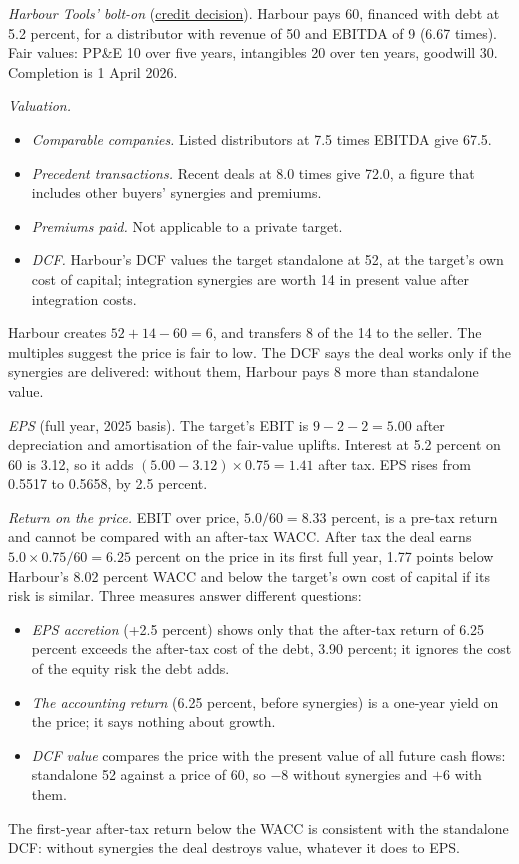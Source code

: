 \begin{qfexample}
 \emph{Harbour Tools' bolt-on} (\hyperref[ex:integrated-credit-decision]{credit decision}). Harbour pays 60, financed with debt at 5.2 percent, for a distributor with revenue of 50 and EBITDA of 9 (6.67 times). Fair values: PP\&E 10 over five years, intangibles 20 over ten years, goodwill 30. Completion is 1 April 2026.

\emph{Valuation.}
\begin{itemize}
\item \emph{Comparable companies.} Listed distributors at 7.5 times EBITDA give 67.5.
\item \emph{Precedent transactions.} Recent deals at 8.0 times give 72.0, a figure that includes other buyers' synergies and premiums.
\item \emph{Premiums paid.} Not applicable to a private target.
\item \emph{DCF.} Harbour's DCF values the target standalone at 52, at the target's own cost of capital; integration synergies are worth 14 in present value after integration costs.
\end{itemize}
Harbour creates $52+14-60=6$, and transfers 8 of the 14 to the seller. The multiples suggest the price is fair to low. The DCF says the deal works only if the synergies are delivered: without them, Harbour pays 8 more than standalone value.

\emph{EPS} (full year, 2025 basis). The target's EBIT is $9-2-2=5.00$ after depreciation and amortisation of the fair-value uplifts. Interest at 5.2 percent on 60 is 3.12, so it adds $(5.00-3.12)\times0.75=1.41$ after tax. EPS rises from 0.5517 to 0.5658, by 2.5 percent.

\emph{Return on the price.} EBIT over price, $5.0/60=8.33$ percent, is a pre-tax return and cannot be compared with an after-tax WACC. After tax the deal earns $5.0\times0.75/60=6.25$ percent on the price in its first full year, 1.77 points below Harbour's 8.02 percent WACC and below the target's own cost of capital if its risk is similar. Three measures answer different questions:
\begin{itemize}
\item \emph{EPS accretion} (+2.5 percent) shows only that the after-tax return of 6.25 percent exceeds the after-tax cost of the debt, 3.90 percent; it ignores the cost of the equity risk the debt adds.
\item \emph{The accounting return} (6.25 percent, before synergies) is a one-year yield on the price; it says nothing about growth.
\item \emph{DCF value} compares the price with the present value of all future cash flows: standalone 52 against a price of 60, so $-8$ without synergies and $+6$ with them.
\end{itemize}
The first-year after-tax return below the WACC is consistent with the standalone DCF: without synergies the deal destroys value, whatever it does to EPS.


\end{qfexample}
